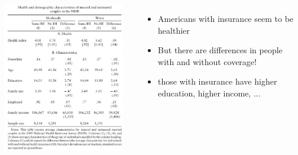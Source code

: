 \documentclass{beamer}
\begin{document}
\begin{frame}

\begin{columns}
\includegraphics[width=10cm,height=6.5cm,keepaspectratio]{RAND Table 1} 

\begin{itemize}
	\item Americans with insurance seem to be healthier 
	\item But there are differences in people with and without coverage!
	\item those with insurance have higher education, higher income, ...
\end{itemize}

\end{columns}

\end{frame}
\end{document}
